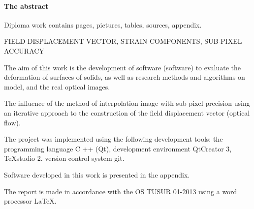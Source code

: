 \newpage
{}
\paragraph{\hfill The abstract \hfill}
Diploma work contains  pages,  pictures,  tables,  sources,  appendix.

FIELD DISPLACEMENT VECTOR, STRAIN COMPONENTS, SUB-PIXEL ACCURACY

The aim of this work is the development of software (software) to evaluate the deformation of surfaces of solids, as well as research methods and algorithms on model, and the real optical images.

The influence of the method of interpolation image with sub-pixel precision using an iterative approach to the construction of the field displacement vector (optical flow).

The project was implemented using the following development tools: the programming language C ++ (Qt), development environment QtCreator 3, TeXstudio 2. version control system git.

Software developed in this work is presented in the appendix.

The report is made in accordance with the OS TUSUR 01-2013 using a word processor \LaTeX.